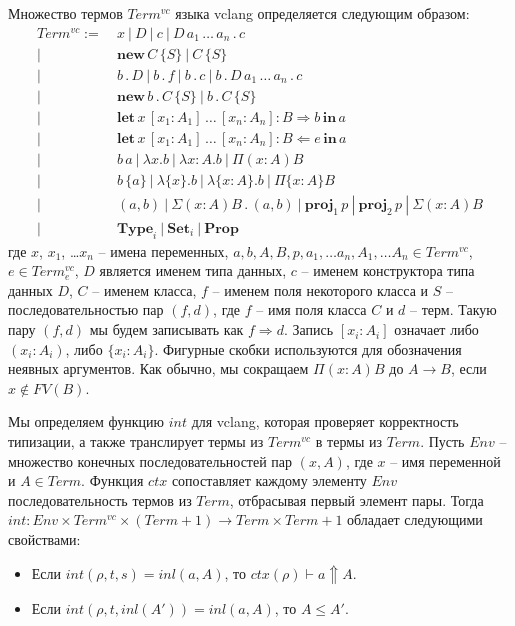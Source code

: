 \documentclass{amsart}
\theoremstyle{definition}
\theoremstyle{remark}
\newcommand{\red}{\Rightarrow}
\numberwithin{figure}{section}
\begin{document}
Множество термов $Term^{vc}$ языка vclang определяется следующим образом:
\begin{align*}
Term^{vc} :=\ & x\ |\ D\ |\ c\ |\ D\,a_1\,\ldots\,a_n\,.\,c \\
      |\ & \mathbf{new}\,C\,\{ S \}\ |\ C\,\{ S \} \\
      |\ & b\,.\,D\ |\ b\,.\,f\ |\ b\,.\,c\ |\ b\,.\,D\,a_1\,\ldots\,a_n\,.\,c \\
      |\ & \mathbf{new}\,b\,.\,C\,\{ S \}\ |\ b\,.\,C\,\{ S \} \\
      |\ & \mathbf{let}\,x\,[x_1 : A_1]\,\ldots\,[x_n : A_n] : B \Rightarrow b\,\mathbf{in}\,a \\
      |\ & \mathbf{let}\,x\,[x_1 : A_1]\,\ldots\,[x_n : A_n] : B \Leftarrow e\,\mathbf{in}\,a \\
      |\ & b\,a\ |\ \lambda x. b\ |\ \lambda x : A. b\ |\ \Pi (x : A) B \\
      |\ & b\,\{a\}\ |\ \lambda \{x\}. b\ |\ \lambda \{x : A\}. b\ |\ \Pi \{x : A\} B \\
      |\ & (a,b)\ |\ \Sigma (x : A) B\,.\,(a,b)\ |\ \mathbf{proj}_1\,p\ |\ \mathbf{proj}_2\,p\ |\ \Sigma (x : A) B \\
      |\ & \mathbf{Type}_i\ |\ \mathbf{Set}_i\ |\ \mathbf{Prop}
\end{align*}
где $x$, $x_1$, \ldots $x_n$ -- имена переменных, $a, b, A, B, p, a_1, \ldots a_n, A_1, \ldots A_n \in Term^{vc}$, $e \in Term^{vc}_e$, $D$ является именем типа данных, $c$ -- именем конструктора типа данных $D$, $C$ -- именем класса, $f$ -- именем поля некоторого класса и $S$ -- последовательностью пар $(f,d)$, где $f$ -- имя поля класса $C$ и $d$ -- терм.
Такую пару $(f,d)$ мы будем записывать как $f \red d$.
Запись $[x_i : A_i]$ означает либо $(x_i : A_i)$, либо $\{x_i : A_i\}$.
Фигурные скобки используются для обозначения неявных аргументов.
Как обычно, мы сокращаем $\Pi (x : A) B$ до $A \to B$, если $x \notin FV(B)$.

Мы определяем функцию $int$ для vclang, которая проверяет корректность типизации, а также транслирует термы из $Term^{vc}$ в термы из $Term$.
Пусть $Env$ -- множество конечных последовательностей пар $(x,A)$, где $x$ -- имя переменной и $A \in Term$.
Функция $ctx$ сопоставляет каждому элементу $Env$ последовательность термов из $Term$, отбрасывая первый элемент пары.
Тогда $int : Env \times Term^{vc} \times (Term + 1) \to Term \times Term + 1$ обладает следующими свойствами:
\begin{itemize}
\item Если $int(\rho, t, s) = inl(a, A)$, то $ctx(\rho) \vdash a \Uparrow A$.
\item Если $int(\rho, t, inl(A')) = inl(a, A)$, то $A \leq A'$.
\end{itemize}
\end{document}
